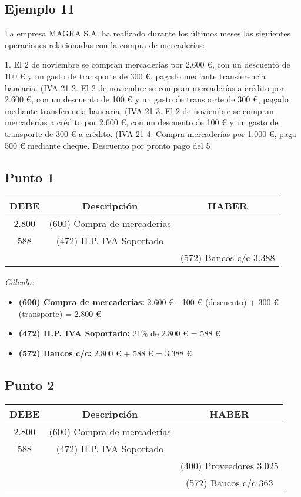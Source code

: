 \documentclass{article}
\begin{document}
\subsection{Ejemplo 11}

La empresa MAGRA S.A. ha realizado durante los últimos meses las siguientes operaciones relacionadas con la compra de mercaderías:

1. El 2 de noviembre se compran mercaderías por 2.600 €, con un descuento de 100 € y un gasto de transporte de 300 €, pagado mediante transferencia bancaria. (IVA 21%
2. El 2 de noviembre se compran mercaderías a crédito por 2.600 €, con un descuento de 100 € y un gasto de transporte de 300 €, pagado mediante transferencia bancaria. (IVA 21%
3. El 2 de noviembre se compran mercaderías a crédito por 2.600 €, con un descuento de 100 € y un gasto de transporte de 300 € a crédito. (IVA 21%
4. Compra mercaderías por 1.000 €, paga 500 € mediante cheque. Descuento por pronto pago del 5%

\subsection*{Punto 1}
\begin{table}[H]
\centering
\begin{tabular}{|c|c|c|}
\hline
\textbf{DEBE} & \textbf{Descripción} & \textbf{HABER} \\
\hline
2.800 & (600) Compra de mercaderías &  \\
588 & (472) H.P. IVA Soportado &  \\
 & & (572) Bancos c/c 3.388 \\
\hline
\end{tabular}
\end{table}

\textit{Cálculo:}
\begin{itemize}
    \item \textbf{(600) Compra de mercaderías:} 2.600 € - 100 € (descuento) + 300 € (transporte) = 2.800 €
    \item \textbf{(472) H.P. IVA Soportado:} 21\% de 2.800 € = 588 €
    \item \textbf{(572) Bancos c/c:} 2.800 € + 588 € = 3.388 €
\end{itemize}

\subsection*{Punto 2}
\begin{table}[H]
\centering
\begin{tabular}{|c|c|c|}
\hline
\textbf{DEBE} & \textbf{Descripción} & \textbf{HABER} \\
\hline
2.800 & (600) Compra de mercaderías &  \\
588 & (472) H.P. IVA Soportado &  \\
 & & (400) Proveedores 3.025 \\
 & & (572) Bancos c/c 363 \\
\hline
\end{tabular}
\end{table}
\end{document}
